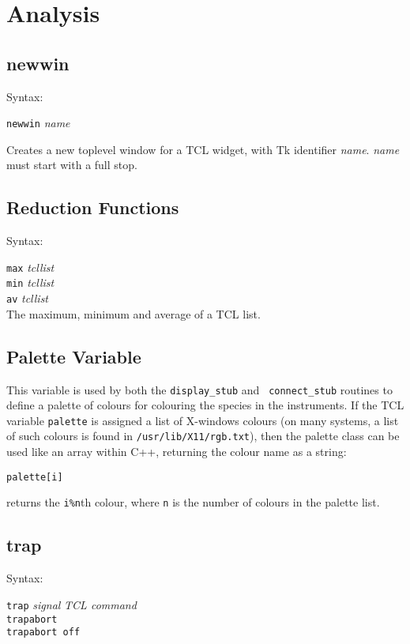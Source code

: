 \section{Analysis}\label{analysis}

\subsection{newwin}\label{TCLnewwin}

Syntax:

{\tt newwin} {\em name}

Creates a new toplevel window for a TCL widget, with Tk identifier
{\em name}. {\em name} must start with a full stop.

\subsection{Reduction Functions}

Syntax:

{\tt max} {\em tcllist}\\
{\tt min} {\em tcllist}\\
{\tt av} {\em tcllist}\\

The maximum, minimum and average of a TCL list.

\subsection{Palette Variable}\label{palette}

This variable is used by both the {\tt display\_stub} and {\tt
  connect\_stub} routines to define a palette of colours for colouring
  the species in the instruments. If the TCL variable {\tt palette} is
  assigned a list of X-windows colours (on many systems, a list of
  such colours is found in {\tt /usr/lib/X11/rgb.txt}),
  then the palette class can be used like an array within C++,
  returning the colour name as a string:
\begin{verbatim}
palette[i]
\end{verbatim}
returns the \verb|i%n|th colour, where {\tt n} is the number of
colours in the palette list.

\subsection{trap}\label{trap}

Syntax:

{\tt trap} {\em signal} {\em TCL command}\\
{\tt trapabort}\\
{\tt trapabort off}

